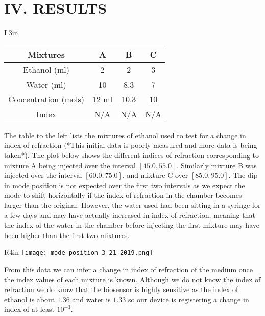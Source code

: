 \section*{IV. RESULTS}
\begin{wrapfigure}{L}{3in}
\begin{tabular}{| c c c c |}
	\toprule
	Mixtures      	     &  A    & B    &  C \\
	\midrule
	Ethanol (ml)  	 	 &  2    & 2    &  3 \\
	Water   (ml)  	 	 & 10    & 8.3  &  7 \\
	Concentration (mols) & 12 ml & 10.3 & 10 \\
   	Index         		 & N/A   & N/A  & N/A \\
	\bottomrule
\end{tabular}
\end{wrapfigure}
The table to the left lists the mixtures of ethanol used to test for a change in index of refraction (*This initial data is poorly measured and more data is being taken*). The plot below shows the different indices of refraction corresponding to mixture A being injected over the interval $[45.0, 55.0]$. Similarly mixture B was injected over the interval $[60.0, 75.0]$, and mixture C over $[85.0, 95.0]$. The dip in mode position is not expected over the first two intervals as we expect the mode to shift horizontally if the index of refraction in the chamber becomes larger than the original. However, the water used had been sitting in a syringe for a few days and may have actually increased in index of refraction, meaning that the index of the water in the chamber before injecting the first mixture may have been higher than the first two mixtures.
\begin{wrapfigure}{R}{4in}
	\texttt{[image: mode\_position\_3-21-2019.png]}
\end{wrapfigure}

From this data we can infer a change in index of refraction of the medium once the index values of each mixture is known. Although we do not know the index of refraction we do know that the biosensor is highly sensitive as the index of ethanol is about $1.36$ and water is $1.33$ so our device is registering a change in index of at least $10^{-3}$.



